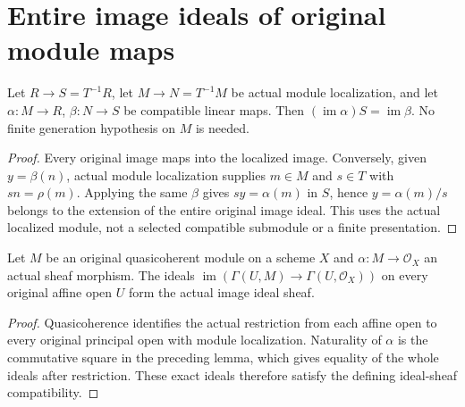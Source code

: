 \section{Entire image ideals of original module maps}

\begin{lemma}
\label{lem:actual-module-image-ideal-localizes}
Let $R\to S=T^{-1}R$, let $M\to N=T^{-1}M$ be actual module
localization, and let $\alpha:M\to R$, $\beta:N\to S$ be compatible
linear maps. Then $(\operatorname{im}\alpha)S=\operatorname{im}\beta$.
No finite generation hypothesis on $M$ is needed.
\leanok
\end{lemma}
\begin{proof}
Every original image maps into the localized image. Conversely, given
$y=\beta(n)$, actual module localization supplies $m\in M$ and $s\in T$
with $sn=\rho(m)$. Applying the same $\beta$ gives
$sy=\alpha(m)$ in $S$, hence $y=\alpha(m)/s$ belongs to the extension
of the entire original image ideal. This uses the actual localized
module, not a selected compatible submodule or a finite presentation.
\end{proof}

\begin{proposition}
\label{prop:actual-module-image-ideal-sheaf}
Let $M$ be an original quasicoherent module on a scheme $X$ and
$\alpha:M\to\mathcal O_X$ an actual sheaf morphism. The ideals
$\operatorname{im}(\Gamma(U,M)\to\Gamma(U,\mathcal O_X))$ on every
original affine open $U$ form the actual image ideal sheaf.
\leanok
\end{proposition}
\begin{proof}
Quasicoherence identifies the actual restriction from each affine open
to every original principal open with module localization. Naturality
of $\alpha$ is the commutative square in the preceding lemma, which
gives equality of the whole ideals after restriction. These exact
ideals therefore satisfy the defining ideal-sheaf compatibility.
\end{proof}
